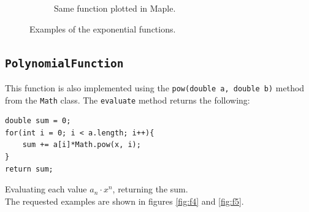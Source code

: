 \begin{figure}[H]
\begin{subfigure}{0.5\textwidth}
        \caption{Same function plotted in Maple.}
        \label{fig:f3Check}
    \end{subfigure}
    \caption{Examples of the exponential functions.}
\end{figure}


\subsection{\texttt{PolynomialFunction}}
This function is also implemented using the \texttt{pow(double a, double b)} method from the \texttt{Math} class. The \texttt{evaluate} method returns the following:

\begin{lstlisting}
double sum = 0;
for(int i = 0; i < a.length; i++){
	sum += a[i]*Math.pow(x, i);
}
return sum;
\end{lstlisting}

Evaluating each value $a_n \cdot x^n$, returning the sum. \\
The requested examples are shown in figures \ref{fig:f4} and \ref{fig:f5}.

